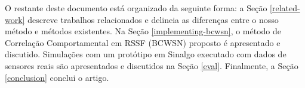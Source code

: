\documentclass{acm_proc_article-sp}
\begin{document}
% 
% 

O restante deste documento está organizado da seguinte forma: a Seção 
\ref{related-work} descreve trabalhos relacionados e delineia as diferenças
entre o nosso método e métodos existentes. Na Seção \ref{implementing-bcwsn},
o método de Correlação Comportamental em RSSF (BCWSN) proposto é apresentado e 
discutido. Simulações com um protótipo em Sinalgo \cite{Sinalgo2007} executado
com dados de sensores reais são apresentados e discutidos na Seção \ref{eval}.
Finalmente, a Seção \ref{conclusion} conclui o artigo.
\vspace*{-.3cm}
\end{document}
